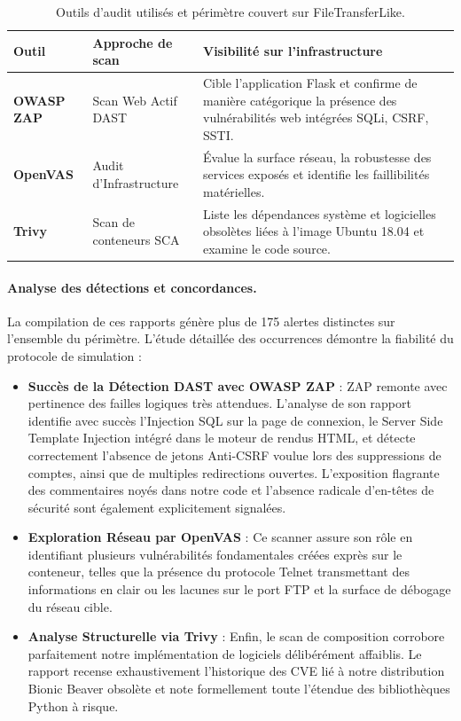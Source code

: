 \documentclass[runningheads]{llncs}
\begin{document}
\begin{table}[H]
\centering
\small
\begin{tabular}{l l p{6.5cm}}
\toprule
\textbf{Outil} & \textbf{Approche de scan} & \textbf{Visibilité sur l'infrastructure} \\
\midrule
\textbf{OWASP ZAP} & Scan Web Actif DAST & Cible l'application Flask et confirme de manière catégorique la présence des vulnérabilités web intégrées SQLi, CSRF, SSTI. \\
\textbf{OpenVAS} & Audit d'Infrastructure & Évalue la surface réseau, la robustesse des services exposés et identifie les faillibilités matérielles. \\
\textbf{Trivy} & Scan de conteneurs SCA & Liste les dépendances système et logicielles obsolètes liées à l'image Ubuntu 18.04 et examine le code source. \\
\bottomrule
\end{tabular}
\caption{Outils d'audit utilisés et périmètre couvert sur FileTransferLike.}
\label{tab:scantools}
\end{table}

\paragraph{Analyse des détections et concordances.} La compilation de ces rapports génère plus de 175 alertes distinctes sur l'ensemble du périmètre. L'étude détaillée des occurrences démontre la fiabilité du protocole de simulation :

\begin{itemize}
    \item \textbf{Succès de la Détection DAST avec OWASP ZAP} : ZAP remonte avec pertinence des failles logiques très attendues. L'analyse de son rapport identifie avec succès l'Injection SQL sur la page de connexion, le Server Side Template Injection intégré dans le moteur de rendus HTML, et détecte correctement l'absence de jetons Anti-CSRF voulue lors des suppressions de comptes, ainsi que de multiples redirections ouvertes. L'exposition flagrante des commentaires noyés dans notre code et l'absence radicale d'en-têtes de sécurité sont également explicitement signalées.
    
    \item \textbf{Exploration Réseau par OpenVAS} : Ce scanner assure son rôle en identifiant plusieurs vulnérabilités fondamentales créées exprès sur le conteneur, telles que la présence du protocole Telnet transmettant des informations en clair ou les lacunes sur le port FTP et la surface de débogage du réseau cible.
    
    \item \textbf{Analyse Structurelle via Trivy} : Enfin, le scan de composition corrobore parfaitement notre implémentation de logiciels délibérément affaiblis. Le rapport recense exhaustivement l'historique des CVE lié à notre distribution Bionic Beaver obsolète et note formellement toute l'étendue des bibliothèques Python à risque.
\end{itemize}
\end{document}
